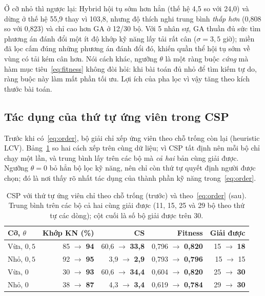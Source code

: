\documentclass{IEEEtran}
\begin{document}
Ở cỡ nhỏ thì ngược lại: Hybrid hội tụ sớm hơn hẳn (thế hệ 4,5 so với 24,0) và dừng ở thế hệ 55,9 thay vì 103,8, nhưng độ thích nghi trung bình \emph{thấp hơn} (0,808 so với 0,823) và chỉ cao hơn GA ở 12/30 bộ. Với 5 nhân sự, GA thuần đủ sức tìm phương án đánh đổi một ít độ khớp kỹ năng lấy tải rất cân ($\sigma=3{,}5$ giờ); miền đã lọc cấm đúng những phương án đánh đổi đó, khiến quần thể hội tụ sớm về vùng có tải kém cân hơn. Nói cách khác, ngưỡng $\theta$ là một ràng buộc \emph{cứng} mà hàm mục tiêu~\eqref{eq:fitness} không đòi hỏi: khi bài toán đủ nhỏ để tìm kiếm tự do, ràng buộc này làm mất phần tối ưu. Lợi ích của pha lọc vì vậy tăng theo kích thước bài toán.

\subsection{Tác dụng của thứ tự ứng viên trong CSP}

Trước khi có~\eqref{eq:order}, bộ giải chỉ xếp ứng viên theo chỗ trống còn lại (heuristic LCV). Bảng~\ref{tab:order} so hai cách xếp trên cùng dữ liệu; vì CSP tất định nên mỗi bộ chỉ chạy một lần, và trung bình lấy trên các bộ mà \emph{cả hai} bản cùng giải được. Ngưỡng $\theta=0$ bỏ hẳn bộ lọc kỹ năng, nên chỉ còn thứ tự quyết định người được chọn; đó là nơi thấy rõ nhất tác dụng của thành phần kỹ năng trong~\eqref{eq:order}.

\begin{table}[t]
\centering
\caption{CSP với thứ tự ứng viên chỉ theo chỗ trống (trước) và theo~\eqref{eq:order} (sau). Trung bình trên các bộ cả hai cùng giải được (11, 15, 25 và 29 bộ theo thứ tự các dòng); cột cuối là số bộ giải được trên 30.}
\label{tab:order}
\setlength{\tabcolsep}{2.6pt}
\begin{tabular}{lrrrr}
\toprule
Cỡ, $\theta$ & Khớp KN (\%) & CS & Fitness & Giải được \\
\midrule
Vừa, $0{,}5$ & 85 $\rightarrow$ \textbf{94} & 60,6 $\rightarrow$ \textbf{33,8} & 0,796 $\rightarrow$ \textbf{0,820} & 15 $\rightarrow$ \textbf{18} \\
Nhỏ, $0{,}5$ & 92 $\rightarrow$ \textbf{95} & 3,9 $\rightarrow$ \textbf{2,9} & 0,793 $\rightarrow$ \textbf{0,796} & 15 $\rightarrow$ 15 \\
Vừa, $0$ & 30 $\rightarrow$ \textbf{93} & 60,6 $\rightarrow$ \textbf{34,4} & 0,604 $\rightarrow$ \textbf{0,820} & 25 $\rightarrow$ \textbf{30} \\
Nhỏ, $0$ & 38 $\rightarrow$ \textbf{87} & 4,3 $\rightarrow$ \textbf{3,4} & 0,619 $\rightarrow$ \textbf{0,784} & 29 $\rightarrow$ \textbf{30} \\
\bottomrule
\end{tabular}
\end{table}
\end{document}
